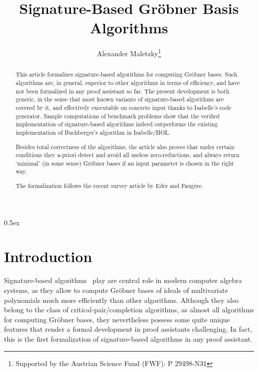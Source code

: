 \documentclass[11pt,a4paper]{article}
\begin{document}
\title{Signature-Based Gr\"obner Basis Algorithms}
\author{Alexander Maletzky\thanks{Supported by the Austrian Science Fund (FWF): P 29498-N31}}
\maketitle

\begin{abstract}
This article formalizes signature-based algorithms for computing Gr\"obner bases. Such 
algorithms are, in general, superior to other algorithms in terms of efficiency, and have not been 
formalized in any proof assistant so far. The present development is both generic, in the sense that 
most known variants of signature-based algorithms are covered by it, and effectively executable on 
concrete input thanks to Isabelle's code generator. Sample computations of benchmark problems show 
that the verified implementation of signature-based algorithms indeed outperforms the existing 
implementation of Buchberger's algorithm in Isabelle/HOL.

Besides total correctness of the algorithms, the article also proves that under certain 
conditions they a-priori detect and avoid all useless zero-reductions, and always return `minimal' 
(in some sense) Gr\"obner bases if an input parameter is chosen in the right way.

The formalization follows the recent survey article by Eder and Faug\`ere.
\end{abstract}

\tableofcontents

\parindent 0pt\parskip 0.5ex

\newpage
\section{Introduction}

Signature-based algorithms~\cite{Faugere2002,Eder2017} play are central role in modern computer 
algebra systems, as they allow to compute Gr\"obner bases of ideals of multivariate polynomials much 
more efficiently than other algorithms. Although they also belong to the class of 
critical-pair/completion algorithms, as almost all algorithms for computing Gr\"obner bases, they 
nevertheless possess some quite unique features that render a formal development in proof assistants 
challenging. In fact, this is the first formalization of signature-based algorithms in any proof 
assistant.
\end{document}

